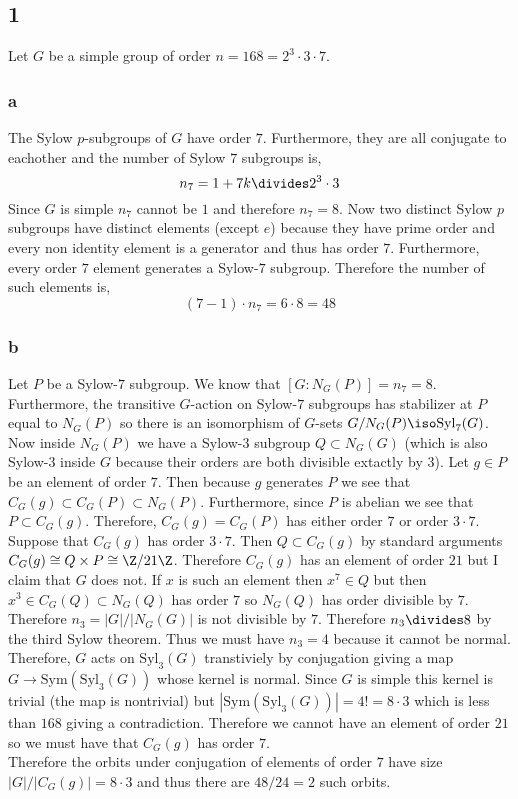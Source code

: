 \documentclass[12pt]{article}
\begin{document}
\subsection{1}

Let $G$ be a simple group of order $n = 168 = 2^3 \cdot 3 \cdot 7$. 

\subsubsection{a}

The Sylow $p$-subgroups of $G$ have order $7$. Furthermore, they are all conjugate to eachother and the number of Sylow $7$ subgroups is,
\[ n_7 = 1 + 7 k \divides 2^3 \cdot 3 \]
Since $G$ is simple $n_7$ cannot be $1$ and therefore $n_7 = 8$. Now two distinct Sylow $p$ subgroups have distinct elements (except $e$) because they have prime order and every non identity element is a generator and thus has order $7$. Furthermore, every order $7$ element generates a Sylow-$7$ subgroup. Therefore the number of such elements is,
\[ (7 - 1) \cdot n_7 = 6 \cdot 8 = 48 \]

\subsubsection{b}

Let $P$ be a Sylow-$7$ subgroup. We know that $[G : N_G(P)] = n_7 = 8$. Furthermore, the transitive $G$-action on Sylow-$7$ subgroups has stabilizer at $P$ equal to $N_G(P)$ so there is an isomorphism of $G$-sets $G / N_G(P) \iso \mathrm{Syl}_7(G)$. Now inside $N_G(P)$ we have a Sylow-$3$ subgroup $Q \subset N_G(G)$ (which is also Sylow-$3$ inside $G$ because their orders are both divisible extactly by $3$). Let $g \in P$ be an element of order $7$. Then because $g$ generates $P$ we see that $C_G(g) \subset C_G(P) \subset N_G(P)$. Furthermore, since $P$ is abelian we see that $P \subset C_G(g)$. Therefore, $C_G(g) = C_G(P)$ has either order $7$ or order $3 \cdot 7$. Suppose that $C_G(g)$ has order $3 \cdot 7$. Then $Q \subset C_G(g)$ by standard arguments $C_G(g) \cong Q \times P \cong \Z / 21 \Z$. Therefore $C_G(g)$ has an element of order $21$ but I claim that $G$ does not. If $x$ is such an element then $x^7 \in Q$ but then $x^3 \in C_G(Q) \subset N_G(Q)$ has order $7$ so $N_G(Q)$ has order divisible by $7$. Therefore $n_3 = |G| / |N_G(G)|$ is not divisible by $7$. Therefore $n_3 \divides 8$ by the third Sylow theorem. Thus we must have $n_3  = 4$ because it cannot be normal. Therefore, $G$ acts on $\mathrm{Syl}_3(G)$ transtiviely by conjugation giving a map $G \to \mathrm{Sym}(\mathrm{Syl}_3(G))$ whose kernel is normal. Since $G$ is simple this kernel is trivial (the map is nontrivial) but $|\mathrm{Sym}(\mathrm{Syl}_3(G))| = 4! = 8 \cdot 3$ which is less than $168$ giving a contradiction. Therefore we cannot have an element of order $21$ so we must have that $C_G(g)$ has order $7$. 
\bigskip\\
Therefore the orbits under conjugation of elements of order $7$ have size $|G|/|C_G(g)| = 8 \cdot 3$ and thus there are $48/24 = 2$ such orbits.
\end{document}

